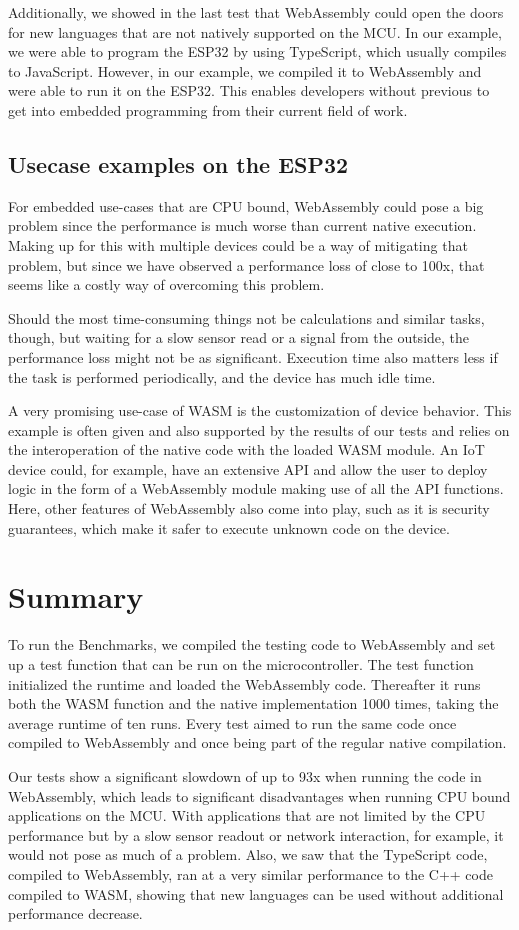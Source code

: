 Additionally, we showed in the last test that WebAssembly could open the doors for new languages that are not natively supported on the MCU. In our example, we were able to program the ESP32 by using TypeScript, which usually compiles to JavaScript. However, in our example, we compiled it to WebAssembly and were able to run it on the ESP32. This enables developers without previous to get into embedded programming from their current field of work.

\subsection{Usecase examples on the ESP32}

For embedded use-cases that are CPU bound, WebAssembly could pose a big problem since the performance is much worse than current native execution. Making up for this with multiple devices could be a way of mitigating that problem, but since we have observed a performance loss of close to 100x, that seems like a costly way of overcoming this problem.

Should the most time-consuming things not be calculations and similar tasks, though, but waiting for a slow sensor read or a signal from the outside, the performance loss might not be as significant. Execution time also matters less if the task is performed periodically, and the device has much idle time.

A very promising use-case of WASM is the customization of device behavior. This example is often given and also supported by the results of our tests and relies on the interoperation of the native code with the loaded WASM module. An IoT device could, for example, have an extensive API and allow the user to deploy logic in the form of a WebAssembly module making use of all the API functions. Here, other features of WebAssembly also come into play, such as it is security guarantees, which make it safer to execute unknown code on the device.

\section{Summary}

To run the Benchmarks, we compiled the testing code to WebAssembly and set up a test function that can be run on the microcontroller. The test function initialized the runtime and loaded the WebAssembly code. Thereafter it runs both the WASM function and the native implementation 1000 times, taking the average runtime of ten runs. Every test aimed to run the same code once compiled to WebAssembly and once being part of the regular native compilation.

Our tests show a significant slowdown of up to 93x when running the code in WebAssembly, which leads to significant disadvantages when running CPU bound applications on the MCU. With applications that are not limited by the CPU performance but by a slow sensor readout or network interaction, for example, it would not pose as much of a problem. Also, we saw that the TypeScript code, compiled to WebAssembly, ran at a very similar performance to the C++ code compiled to WASM, showing that new languages can be used without additional performance decrease.